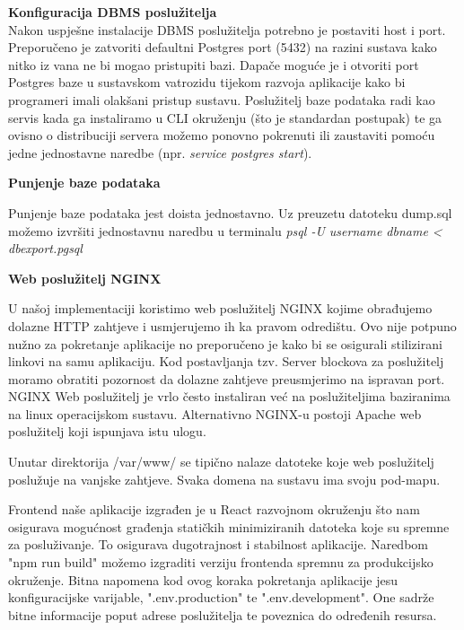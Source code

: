 			
			\textbf{Konfiguracija DBMS poslužitelja}\\
			
			Nakon uspješne instalacije DBMS poslužitelja potrebno je postaviti host i port. Preporučeno je zatvoriti defaultni Postgres port (5432) na razini sustava kako nitko iz vana ne bi mogao pristupiti bazi.
			Dapače moguće je i otvoriti port Postgres baze u sustavskom vatrozidu tijekom razvoja aplikacije kako bi programeri imali olakšani pristup sustavu.
			Poslužitelj baze podataka radi kao servis kada ga instaliramo u CLI okruženju (što je standardan postupak) te ga ovisno o distribuciji servera možemo ponovno pokrenuti ili zaustaviti pomoću jedne jednostavne naredbe (npr. \textit{service postgres start}).\newline
			
			
			\textbf{Punjenje baze podataka}
			
			Punjenje baze podataka jest doista jednostavno. Uz preuzetu datoteku dump.sql možemo izvršiti jednostavnu naredbu u terminalu \textit{psql -U username dbname < dbexport.pgsql}\newline
			
			
			\textbf{Web poslužitelj NGINX}
			
			U našoj implementaciji koristimo web poslužitelj NGINX kojime obrađujemo dolazne HTTP zahtjeve i usmjerujemo ih ka pravom odredištu. Ovo nije potpuno nužno za pokretanje aplikacije no preporučeno je kako bi se osigurali stilizirani linkovi na samu aplikaciju.
			Kod postavljanja tzv. Server blockova za poslužitelj moramo obratiti pozornost da dolazne zahtjeve preusmjerimo na ispravan port. NGINX Web poslužitelj je vrlo često instaliran već na poslužiteljima baziranima na linux operacijskom sustavu. Alternativno NGINX-u postoji Apache web poslužitelj koji ispunjava istu ulogu.
			
			Unutar direktorija /var/www/ se tipično nalaze datoteke koje web poslužitelj poslužuje na vanjske zahtjeve. Svaka domena na sustavu ima svoju pod-mapu.
			
			Frontend naše aplikacije izgrađen je u React razvojnom okruženju što nam osigurava mogućnost građenja statičkih minimiziranih datoteka koje su spremne za posluživanje. To osigurava dugotrajnost i stabilnost aplikacije. Naredbom "npm run build" možemo izgraditi verziju frontenda spremnu za produkcijsko okruženje.
			Bitna napomena kod ovog koraka pokretanja aplikacije jesu konfiguracijske varijable, ".env.production" te ".env.development". One sadrže bitne informacije poput adrese poslužitelja te poveznica do određenih resursa.
			
